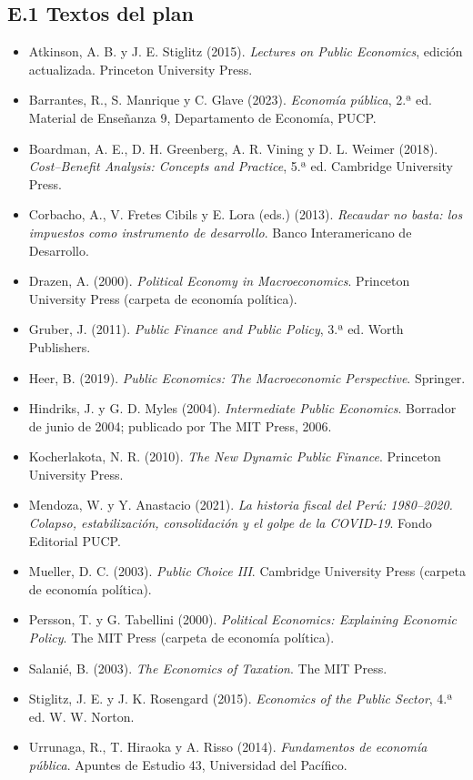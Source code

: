 \documentclass[11pt,a4paper]{article}
\begin{document}
\subsection*{E.1 Textos del plan}
{\small
\begin{itemize}[leftmargin=1.4em,itemsep=1pt,label={}]
\item Atkinson, A. B. y J. E. Stiglitz (2015). \emph{Lectures on Public Economics}, edición actualizada. Princeton University Press.
\item Barrantes, R., S. Manrique y C. Glave (2023). \emph{Economía pública}, 2.ª ed. Material de Enseñanza 9, Departamento de Economía, PUCP.
\item Boardman, A. E., D. H. Greenberg, A. R. Vining y D. L. Weimer (2018). \emph{Cost--Benefit Analysis: Concepts and Practice}, 5.ª ed. Cambridge University Press.
\item Corbacho, A., V. Fretes Cibils y E. Lora (eds.) (2013). \emph{Recaudar no basta: los impuestos como instrumento de desarrollo}. Banco Interamericano de Desarrollo.
\item Drazen, A. (2000). \emph{Political Economy in Macroeconomics}. Princeton University Press (carpeta de economía política).
\item Gruber, J. (2011). \emph{Public Finance and Public Policy}, 3.ª ed. Worth Publishers.
\item Heer, B. (2019). \emph{Public Economics: The Macroeconomic Perspective}. Springer.
\item Hindriks, J. y G. D. Myles (2004). \emph{Intermediate Public Economics}. Borrador de junio de 2004; publicado por The MIT Press, 2006.
\item Kocherlakota, N. R. (2010). \emph{The New Dynamic Public Finance}. Princeton University Press.
\item Mendoza, W. y Y. Anastacio (2021). \emph{La historia fiscal del Perú: 1980--2020. Colapso, estabilización, consolidación y el golpe de la COVID-19}. Fondo Editorial PUCP.
\item Mueller, D. C. (2003). \emph{Public Choice III}. Cambridge University Press (carpeta de economía política).
\item Persson, T. y G. Tabellini (2000). \emph{Political Economics: Explaining Economic Policy}. The MIT Press (carpeta de economía política).
\item Salanié, B. (2003). \emph{The Economics of Taxation}. The MIT Press.
\item Stiglitz, J. E. y J. K. Rosengard (2015). \emph{Economics of the Public Sector}, 4.ª ed. W. W. Norton.
\item Urrunaga, R., T. Hiraoka y A. Risso (2014). \emph{Fundamentos de economía pública}. Apuntes de Estudio 43, Universidad del Pacífico.
\end{itemize}
}
\end{document}
